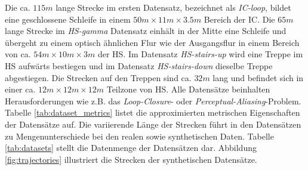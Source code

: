 Die ca. $115m$ lange Strecke im ersten Datensatz, bezeichnet als \textit{IC-loop}, bildet eine geschlossene Schleife in einem $50m \times 11m \times 3.5m$ Bereich der IC. Die $65m$ lange Strecke im \textit{HS-gamma} Datensatz einhält in der Mitte eine Schleife und übergeht zu einem optisch ähnlichen Flur wie der Ausgangsflur in einem Bereich von ca. $54m \times 10m \times 3m$ der HS. Im Datensatz \textit{HS-stairs-up} wird eine Treppe im HS aufwärts bestiegen und im Datensatz \textit{HS-stairs-down} dieselbe Treppe abgestiegen. Die Strecken auf den Treppen sind ca. $32m$ lang und befindet sich in einer ca. $12m \times 12m \times 12m$ Teilzone von HS.
Alle Datensätze beinhalten Herausforderungen wie z.B. das \textit{Loop-Closure}- oder \textit{Perceptual-Aliasing}-Problem.
Tabelle \ref{tab:dataset_metrics} listet die approximierten metrischen Eigenschaften der Datensätze auf. 
Die variierende Länge der Strecken führt in den Datensätzen zu Mengenunterschiede bei den realen sowie synthetischen Daten. Tabelle \ref{tab:datasets} stellt die Datenmenge der Datensätzen dar.
Abbildung \ref{fig:trajectories} illustriert die Strecken der synthetischen Datensätze. 
